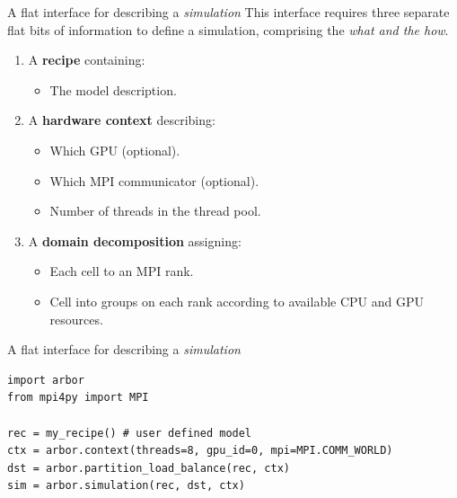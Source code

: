 \documentclass[aspectratio=43]{beamer}
\begin{document}
\begin{frame}[fragile]{A flat interface for describing a \emph{simulation}}
    This interface requires three separate flat bits of information to define a simulation, comprising the \emph{what and the how}.

    \vspace{5pt}

    \begin{enumerate}
        \item A \textbf{recipe} containing: 
        \begin{itemize}
            \item The model description. 
        \end{itemize}
        \item A \textbf{hardware context} describing:
        \begin{itemize}
            \item Which GPU (optional).
            \item Which MPI communicator (optional).
            \item Number of threads in the thread pool.
        \end{itemize}
        \item A \textbf{domain decomposition} assigning:
        \begin{itemize}
            \item Each cell to an MPI rank.
            \item Cell into groups on each rank according to available CPU and GPU resources.
        \end{itemize}
    \end{enumerate}
\end{frame}

\begin{frame}[fragile]{A flat interface for describing a \emph{simulation}}
    \begin{lstlisting}[style=talkpython]
import arbor
from mpi4py import MPI

rec = my_recipe() # user defined model
ctx = arbor.context(threads=8, gpu_id=0, mpi=MPI.COMM_WORLD)
dst = arbor.partition_load_balance(rec, ctx)
sim = arbor.simulation(rec, dst, ctx)

    \end{lstlisting}
\end{frame}
\end{document}
